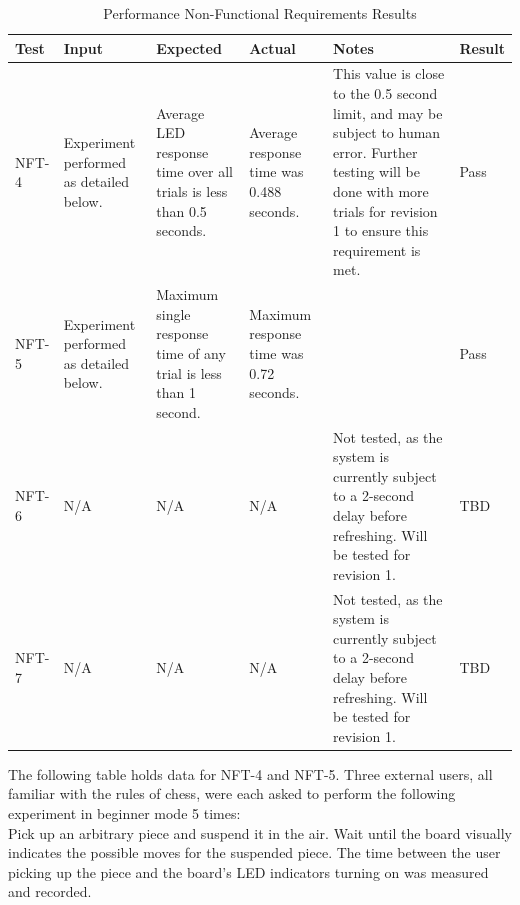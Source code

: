\documentclass[12pt, titlepage]{article}
\begin{document}
\begin{table}[H]
    \centering
        \setlength{\leftmargini}{0.4cm}
        \begin{tabular}{| >{\centering\arraybackslash}m{2cm} | 
            >{\centering\arraybackslash}m{2.5cm} | 
            >{\centering\arraybackslash}m{3cm} | 
            >{\centering\arraybackslash}m{2cm} |
            >{\centering\arraybackslash}m{4cm} |
            >{\centering\arraybackslash}m{1.5cm} |}
        \hline
        \rowcolor[gray]{0.9}
        Test & Input & Expected & Actual & Notes & Result\\
        \hline
        NFT-4 & Experiment performed as detailed below. & Average LED response time over all trials is less than 0.5 seconds. & Average response time was 0.488 seconds. & This value is close to the 0.5 second limit, and may be subject to human error. Further testing will be done with more trials for revision 1 to ensure this requirement is met. & Pass \\
        \hline
        NFT-5 & Experiment performed as detailed below. & Maximum single response time of any trial is less than 1 second. & Maximum response time was 0.72 seconds. &  & Pass \\
        \hline
        NFT-6 & N/A & N/A & N/A & Not tested, as the system is currently subject to a 2-second delay before refreshing. Will be tested for revision 1. & TBD \\
        \hline
        NFT-7 & N/A & N/A & N/A & Not tested, as the system is currently subject to a 2-second delay before refreshing. Will be tested for revision 1. & TBD \\
        \hline
        \end{tabular}
    \caption{Performance Non-Functional Requirements Results}
\end{table}

\newpage
The following table holds data for NFT-4 and NFT-5. Three external users, all familiar with the rules of chess, were each asked to perform the following experiment in beginner mode 5 times:
\medskip
\\
Pick up an arbitrary piece and suspend it in the air. Wait until the board visually indicates the possible moves for the suspended piece. The time between the user picking up 
the piece and the board's LED indicators turning on was measured and recorded.
\end{document}
